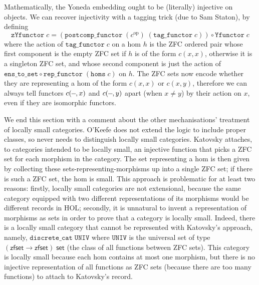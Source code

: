 \documentclass[twoside,titlepage,11pt]{article}
\begin{document}
Mathematically, the Yoneda embedding ought to be (literally) injective on objects.
We can recover injectivity with a tagging trick (due to Sam Staton), by defining
\[\mathtt{zYfunctor}\;c=(\mathtt{postcomp\_functor}\;(c^\mathrm{op})\;(\mathtt{tag\_functor}\;c))\circ\mathtt{Yfunctor}\;c\]
where the action of $\mathtt{tag\_functor}\;c$ on a hom $h$ is the ZFC ordered pair whose first component is the empty ZFC set if $h$ is of the form $c(x,x)$, otherwise it is a singleton ZFC set, and whose second component is just the action of $\mathtt{ens\_to\_set}\circ\mathtt{rep\_functor}\;(\mathtt{homs}\;c)$ on $h$.
The ZFC sets now encode whether they are representing a hom of the form $c(x,x)$ or $c(x,y)$, therefore we can always tell functors $c(\blank,x)$ and $c(\blank,y)$ apart (when $x\neq y$) by their action on $x$, even if they are isomorphic functors.

We end this section with a comment about the other mechanisations' treatment of locally small categories.
O'Keefe does not extend the logic to include proper classes, so never needs to distinguish locally small categories.
Katovsky attaches, to categories intended to be locally small, an injective function that picks a ZFC set for each morphism in the category.
The set representing a hom is then given by collecting these sets-representing-morphisms up into a single ZFC set; if there is such a ZFC set, the hom is small.
This approach is problematic for at least two reasons: firstly, locally small categories are not extensional, because the same category equipped with two different representations of its morphisms would be different records in HOL; secondly, it is unnatural to invent a representation of morphisms as sets in order to prove that a category is locally small.
Indeed, there is a locally small category that cannot be represented with Katovsky's approach, namely, $\mathtt{discrete\_cat}\;\mathtt{UNIV}$ where $\mathtt{UNIV}$ is the universal set of type $(\mathsf{zfset}\to\mathsf{zfset})\;\mathsf{set}$ (the class of all functions between ZFC sets).
This category is locally small because each hom contains at most one morphism, but there is no injective representation of all functions as ZFC sets (because there are too many functions) to attach to Katovsky's record.
\end{document}
